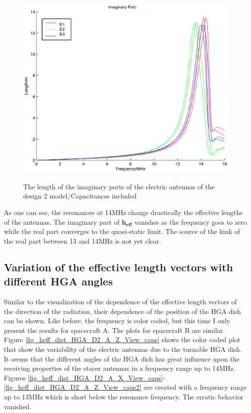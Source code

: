 \documentclass[a4paper,14pt]{extbook}
\begin{document}
\begin{figure}
\begin{center}
\includegraphics[scale=0.45]{HeffLengthImagD2_caps.eps} \\
\caption{The length of the imaginary parts of the electric antennas of the  design 2 model/Capacitances included} \label{fig_Heff_length_imag_caps_D2}
\end{center}
\end{figure}


As one can see, the resonances at 14MHz change drastically the
effective lengths of the antennas. The imaginary part of $\mathbf{h_{eff}}$ vanishes as the
frequency goes to zero while the real part converges to the quasi-static limit. The source of the kink of the real part between 13 and 14MHz is not yet clear.
\\

\subsection{Variation of the effective length vectors with different HGA angles}

Similar to the visualization of the dependence of the effective length vectors of the direction of the radiation, their dependence of the position of the HGA dish can be shown. Like before, the frequency is color coded, but this time I only present the results for spacecraft A. The plots for spacecraft B are similar.\\



Figure \ref{fig_heff_dist_HGA_D2_A_Z_View_caps} shows the color coded plot that show the variability of the electric antennas due to the turnable HGA dish. It seems that the different angles of the HGA dish has great influence upon the receiving properties of the stacer antennas in a frequency range up to 14MHz. Figures \ref{fig_heff_dist_HGA_D2_A_X_View_caps}-\ref{fig_heff_dist_HGA_D2_A_Z_View_caps2} are created with a frequency range up to 13MHz which is short below the resonance frequency. The erratic behavior vanished.\\
\end{document}
